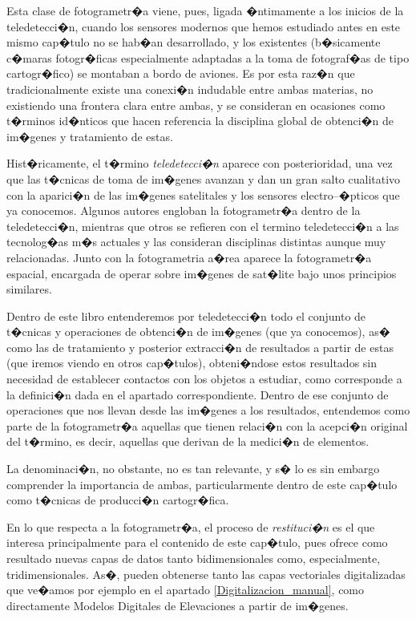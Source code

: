 Esta clase de fotogrametr�a viene, pues, ligada �ntimamente a los inicios de la teledetecci�n, cuando los sensores modernos que hemos estudiado antes en este mismo cap�tulo no se hab�an desarrollado, y los existentes (b�sicamente c�maras fotogr�ficas especialmente adaptadas a la toma de fotograf�as de tipo cartogr�fico) se montaban a bordo de aviones. Es por esta raz�n que tradicionalmente existe una conexi�n indudable entre ambas materias, no existiendo una frontera clara entre ambas, y se consideran en ocasiones como t�rminos id�nticos que hacen referencia la disciplina global de obtenci�n de im�genes y tratamiento de estas.

Hist�ricamente, el t�rmino \emph{teledetecci�n} aparece con posterioridad, una vez que las t�cnicas de toma de im�genes avanzan y dan un gran salto cualitativo con la aparici�n de las im�genes satelitales y los sensores electro--�pticos que ya conocemos. Algunos autores engloban la fotogrametr�a dentro de la teledetecci�n, mientras que otros se refieren con el termino teledetecci�n a las tecnolog�as m�s actuales y las consideran disciplinas distintas aunque muy relacionadas. Junto con la fotogrametria a�rea aparece la fotogrametr�a espacial, encargada de operar sobre im�genes de sat�lite bajo unos principios similares.

Dentro de este libro entenderemos por teledetecci�n todo el conjunto de t�cnicas y operaciones de obtenci�n de im�genes (que ya conocemos), as� como las de tratamiento y posterior extracci�n de resultados a partir de estas (que iremos viendo en otros cap�tulos), obteni�ndose estos resultados sin necesidad de establecer contactos con los objetos a estudiar, como corresponde a la definici�n dada en el apartado correspondiente. Dentro de ese conjunto de operaciones que nos llevan desde las im�genes a los resultados, entendemos como parte de la fotogrametr�a aquellas que tienen relaci�n con la acepci�n original del t�rmino, es decir, aquellas que derivan de la medici�n de elementos.

La denominaci�n, no obstante, no es tan relevante, y s� lo es sin embargo comprender la importancia de ambas, particularmente dentro de este cap�tulo como t�cnicas de producci�n cartogr�fica. 

En lo que respecta a la fotogrametr�a, el proceso de \emph{restituci�n} es el que interesa principalmente para el contenido de este cap�tulo, pues ofrece como resultado nuevas capas de datos tanto bidimensionales como, especialmente, tridimensionales. As�, pueden obtenerse tanto las capas vectoriales digitalizadas que ve�amos por ejemplo en el apartado \ref{Digitalizacion_manual}, como directamente Modelos Digitales de Elevaciones a partir de im�genes.

